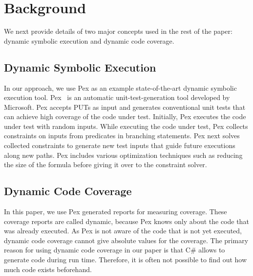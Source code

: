 \section{Background}
\label{sec:background}

We next provide details of two major concepts used in the rest of the paper: dynamic symbolic execution and dynamic code coverage.

\subsection{Dynamic Symbolic Execution}

In our approach, we use Pex as an example state-of-the-art dynamic symbolic execution tool. Pex~\cite{tillman:pexwhite} is an automatic unit-test-generation tool developed by Microsoft. Pex accepts PUTs as input and generates conventional unit tests that can achieve high coverage of the code under test. Initially, Pex executes the code under test with random inputs. While executing the code under test, Pex collects constraints on inputs from predicates in branching statements. Pex next solves collected constraints to generate new test inputs that guide future executions along new paths. Pex includes various optimization techniques such as reducing the size of the formula before giving it over to the constraint solver.

\subsection{Dynamic Code Coverage}
\label{sec:blockcov}

In this paper, we use Pex generated reports for measuring coverage. These coverage reports are called dynamic, because Pex knows only about the code that was already executed. As Pex is not aware of the code that is not yet executed, dynamic code coverage cannot give absolute values for the coverage. The primary reason for using dynamic code coverage in our paper is that C\# allows to generate code during run time. Therefore, it is often not possible to find out how much code exists beforehand.